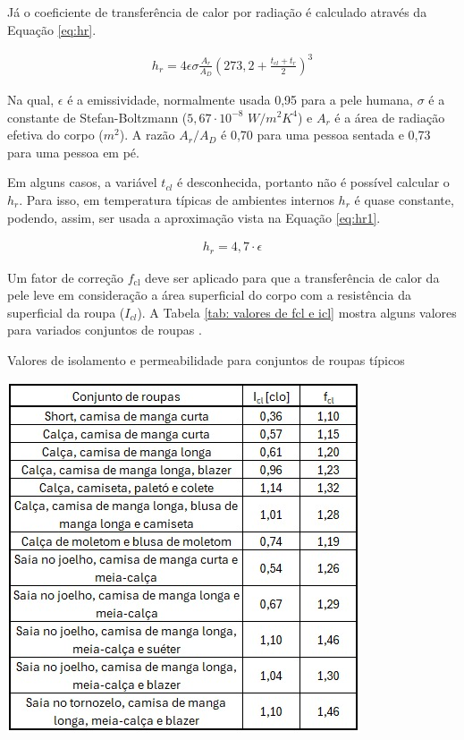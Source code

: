 \documentclass[acronym,symbols,table]{fei}
\begin{document}
Já o coeficiente de transferência de calor por radiação é calculado através da Equação \ref{eq:hr}.

\begin{equation} \label{eq:hr}
    \begin{aligned}
   h_{r}=4 \epsilon \sigma \frac{A_{r}}{A_{D}}(273,2 + \frac{t_{cl}+t_{r}}{2})^3
    \end{aligned}
\end{equation}

Na qual, $\epsilon$ é a emissividade, normalmente usada 0,95 para a pele humana, $\sigma$ é a constante de Stefan-Boltzmann ($5,67\cdot10^{-8}$ $W/m^{2}K^{4}$) e $A_{r}$ é a área de radiação efetiva do corpo ($m^2$). A razão $A_{r}/A_{D}$ é 0,70 para uma pessoa sentada e 0,73 para uma pessoa em pé.

Em alguns casos, a variável $t_{cl}$ é desconhecida, portanto não é possível calcular o $h_{r}$. Para isso, em temperatura típicas de ambientes internos $h_{r}$ é quase constante, podendo, assim, ser usada a aproximação vista na Equação \ref{eq:hr1}.

\begin{equation} \label{eq:hr1}
    \begin{aligned}
   h_{r}=4,7\cdot \epsilon
    \end{aligned}
\end{equation}


Um fator de correção $f_{\text{cl}}$ deve ser aplicado para que a transferência de calor da pele leve em consideração a área superficial do corpo com a resistência da superficial da roupa ($I_{cl}$). A Tabela \ref{tab: valores de fcl e icl} mostra alguns valores para variados conjuntos de roupas \cite{mccullough1989data}.

\begin{table}[!htb] 
 \centering
    \caption{Valores de isolamento e permeabilidade para conjuntos de roupas típicos}
    \includegraphics[width=0.5\linewidth]{Tabelas/tabela-roupas.jpeg}
    \label{tab: valores de fcl e icl}
\end{table}
\end{document}
